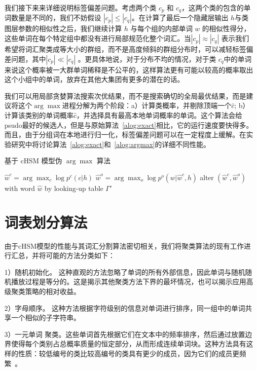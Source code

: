 我们接下来来详细说明标签偏差问题。考虑两个类 $ c_p $ 和 $ c_q $，这两个类的包含的单词数量是不同的，我们不妨假设 $| c_p | \le | c_q |$。在计算了最后一个隐藏层输出 $h$与类图层参数的相似性之后，我们继续计算 $h$ 与每个组的内部单词 $w$ 的相似性得分，这些单词在每个特定组中都没有进行局部规范化整个词汇。当$ | c_p | \approx|c_q|$ 表示我们希望将词汇聚类成等大小的群组，而不是高度倾斜的群组分布时，可以减轻标签偏差问题，其中$ | c_p | \ll | c_q | $ 。更具体地说，对于分布不均的情况，对于类 $ c_q $中的单词来说这个概率被一大群单词稀释是不公平的，这样算法更有可能以较高的概率取出这个小组中的单词，放弃在其他大集团有更多的潜在的话。

我们可以用局部贪婪算法搜索次优结果，而不是搜索确切的全局最优结果，而是建议将这个$ \arg\max $进程分解为两个阶段：a）计算类概率，并剔除顶端一个$ \hat c $; b）计算该类别的单词概率$ \hat c $，并选择具有最高本地单词概率的单词。这个算法会给psudo最好的候选人，但是与原始算法~\ref{alog:exact}相比，它的运行速度要快得多。而且，由于分组词在本地进行归一化，标签偏差问题可以在一定程度上缓解。在实验研究中将讨论算法~\ref{alog:exact}和~\ref{alog:argmax}的详细不同性能。
\begin{algorithm}[!ht]
 \caption{基于 cHSM 模型伪 $\arg\max$ 算法}\label{alog:argmax}
 $\hat w^c=\arg\max_c{\log p^c(c|h)}$ 
 $\hat w^o=\arg\max_o{\log p^o(w|\hat w^c,h)}$
 alter $(\hat w^c,\hat w^o)$ with word $\hat w$ by looking-up table $\Gamma'$ \;
\end{algorithm}

\section{词表划分算法}
由于cHSM模型的性能与其词汇分割算法密切相关，我们将聚类算法的现有工作进行汇总，并将可能的方法分类如下：

1）随机初始化。 这种直观的方法忽略了单词的所有外部信息，因此单词与随机随机播放过程是等分的。这是揭示其他聚类方法下界的最坏情况，也可以揭示应用高级聚类策略的相对收益。

2）字母顺序。 这种方法根据字符级别的信息对单词进行排序，同一组中的单词共享一个相似的子字符串。

3）一元单词 聚类。这些单词首先根据它们在文本中的频率排序，然后通过放置边界使得每个类别占总概率质量的恒定部分，从而形成连续单词块。这种方法具有这样的性质：较低编号的类比较高编号的类具有更少的成员，因为它们的成员更频繁~。

